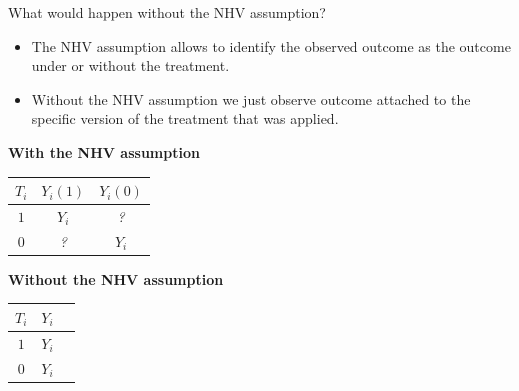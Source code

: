 \documentclass[aspectratio=169]{beamer}
\begin{document}
\begin{frame}{What would happen without the NHV assumption?}

\begin{itemize}
    \item The NHV assumption allows to identify the observed outcome as the outcome under or without the treatment. 

    \item Without the NHV assumption we just observe outcome attached to the specific version of the treatment that was applied.
\end{itemize}

\vspace{0.3cm}

\hspace{0.3cm}
\begin{minipage}{0.45\textwidth}
\centering
\begin{center}
    \textbf{With the NHV assumption} 
\end{center}
\vspace{-0.4cm}

\begin{table}[h!]
\centering
\renewcommand{\arraystretch}{1.3} %
\setlength{\tabcolsep}{10pt}      %
\begin{tabular}{ccc}
$T_i$ & $Y_i(1)$ & $Y_i(0)$ \\
\hline
$1$ & $Y_i$ & \textit{?} \\
$0$ & \textit{?} & $Y_i$ \\
\end{tabular}
\end{table}

\end{minipage}
\hspace{0.2cm}
\begin{minipage}{0.45\textwidth}
\centering
\begin{center}
    \textbf{Without the NHV assumption} 
\end{center}
\vspace{-0.4cm}

\begin{table}[h!]
\centering
\renewcommand{\arraystretch}{1.3} %
\setlength{\tabcolsep}{10pt}      %
\begin{tabular}{ccc}
$T_i$ & $Y_i$ \\
\hline
$1$ & $Y_i$ \\
$0$ & $Y_i$ \\
\end{tabular}
\end{table}
    

\end{minipage}
\end{frame}
\end{document}
